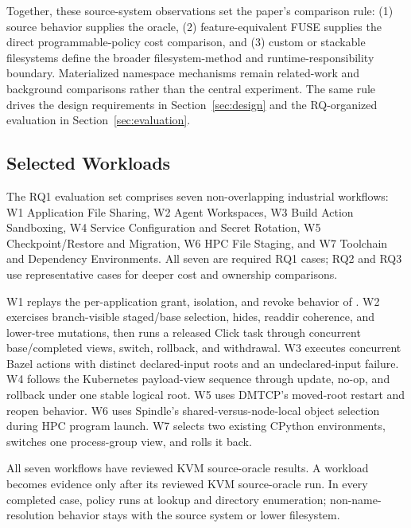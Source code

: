 Together, these source-system observations set the paper's comparison rule:
(1) source behavior supplies the oracle, (2) feature-equivalent FUSE supplies
the direct programmable-policy cost comparison, and (3) custom or stackable
filesystems define the broader filesystem-method and runtime-responsibility
boundary. Materialized
namespace mechanisms remain related-work and background comparisons rather than
the central experiment. The same rule drives
the design requirements in Section~\ref{sec:design} and the RQ-organized
evaluation in Section~\ref{sec:evaluation}.

\subsection{Selected Workloads}

The RQ1 evaluation set comprises seven non-overlapping industrial workflows:
W1 Application File Sharing, W2 Agent Workspaces, W3 Build Action Sandboxing,
W4 Service Configuration and Secret Rotation, W5 Checkpoint/Restore and
Migration, W6 HPC File Staging, and W7 Toolchain and Dependency Environments.
All seven are required RQ1 cases; RQ2 and RQ3 use representative cases for
deeper cost and ownership comparisons.

W1 replays the per-application grant, isolation, and revoke behavior of
. W2 exercises branch-visible staged/base selection,
hides, readdir coherence, and lower-tree mutations, then runs a released Click
task through concurrent base/completed views, switch, rollback, and withdrawal.
W3 executes concurrent Bazel actions with distinct declared-input roots and an
undeclared-input failure. W4 follows the Kubernetes 
payload-view sequence through update, no-op, and rollback under one stable
logical root. W5 uses DMTCP's moved-root restart and reopen behavior. W6 uses
Spindle's shared-versus-node-local object selection during HPC program launch.
W7 selects two existing CPython environments, switches one process-group view,
and rolls it back.

All seven workflows have reviewed KVM source-oracle results. A workload becomes
evidence only after its reviewed KVM source-oracle run. In every completed
case, policy runs at lookup and directory enumeration;
non-name-resolution behavior stays with the source system or lower filesystem.
